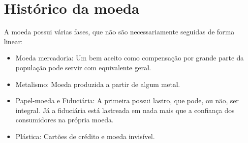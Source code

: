 \documentclass[12pt,a4paper,oneside,brazil]{abntex2}
\begin{document}
\section{Histórico da moeda}
A moeda possui várias fases, que não são necessariamente seguidas de forma linear:
\begin{itemize}
\item Moeda mercadoria: Um bem aceito como compensação por grande parte da população pode servir com equivalente geral.
\item Metalismo: Moeda produzida a partir de algum metal.
\item Papel-moeda e Fiduciária: A primeira possui lastro, que pode, ou não, ser integral. Já a fiduciária está lastreada em nada mais que a confiança dos consumidores na própria moeda.
\item Plástica: Cartões de crédito e moeda invisível.
\end{itemize}
\end{document}
